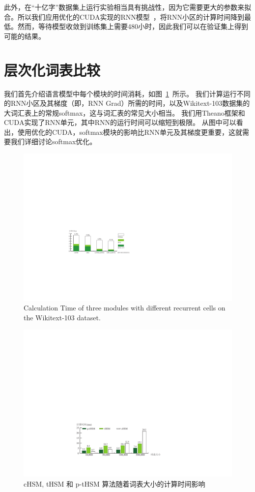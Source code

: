 此外，在“十亿字”数据集上运行实验相当具有挑战性，因为它需要更大的参数来拟合。所以我们应用优化的CUDA实现的RNN模型~，将RNN小区的计算时间降到最低。然而，等待模型收敛到训练集上需要480小时，因此我们可以在验证集上得到可能的结果。

\section{层次化词表比较}
我们首先介绍语言模型中每个模块的时间消耗，如图~\ref{fig:rnn_timing}~所示。 我们计算运行不同的RNN小区及其梯度（即，RNN Grad）所需的时间，以及Wikitext-103数据集的大词汇表上的常规softmax，这与词汇表的常见大小相当。 我们用Theano框架和CUDA实现了RNN单元，其中RNN的运行时间可以缩短到极限。 从图中可以看出，使用优化的CUDA，softmax模块的影响比RNN单元及其梯度更重要，这就需要我们详细讨论softmax优化。
\begin{figure}[!ht]
  \centering
  \includegraphics[width=0.9\columnwidth]{./figures/rnn_timing.pdf}
  \caption{Calculation Time of three modules with different recurrent cells on the Wikitext-103 dataset.}\label{fig:rnn_timing}
\end{figure}
\begin{figure}[!ht]
  \centering
  \includegraphics[width=0.9\columnwidth]{./figures/all_time.pdf}
  \caption{cHSM, tHSM 和 p-tHSM 算法随着词表大小的计算时间影响}\label{fig:hsm_benchmark}
\end{figure}

